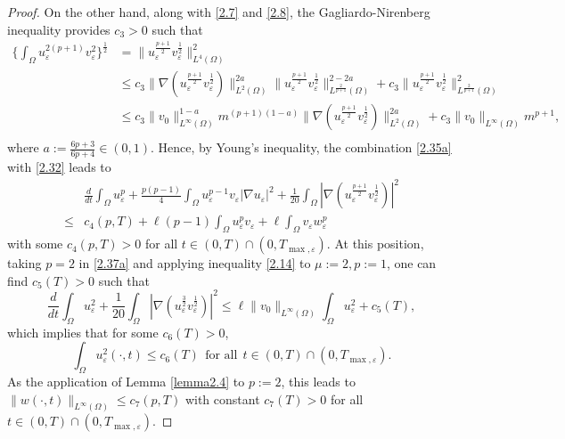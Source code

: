 \documentclass[12pt]{article}
\theoremstyle{plain}
\theoremstyle{definition}
\numberwithin{equation}{section}
\begin{document}
\begin{proof}
     On the other hand, along with \eqref{2.7} and \eqref{2.8}, the Gagliardo-Nirenberg inequality provides $c_3>0$ such that
        \begin{equation}\label{2.32}
    \begin{split}
        \bigg\{\int_\Omega u_\varepsilon^{2(p+1)}v_\varepsilon^2\bigg\}^{\frac1 2}&=\|u_\varepsilon^{\frac{p+1}{2}}v_\varepsilon^{\frac{1}{2}}\|_{L^4(\Omega)}^2\\
        &\leq c_3\|\nabla(u_\varepsilon^{\frac{p+1}{2}}
        v_\varepsilon^{\frac{1}{2}})\|_{L^2(\Omega)}^{2a}
        \|u_\varepsilon^{\frac{p+1}{2}}
        v_\varepsilon^{\frac{1}{2}}\|_{L^{\frac{2}{p+1}}(\Omega)}^{2-2a}
        +c_3\|u_\varepsilon^{\frac{p+1}{2}}v_\varepsilon^{\frac{1}{2}}\|_{L^\frac{2}{p+1}(\Omega)}^2\\
        &\leq c_3\|v_0\|_{L^\infty(\Omega)}^{1-a}m^{(p+1)(1-a)}\|\nabla(u_\varepsilon^{\frac{p+1}{2}}v_\varepsilon^{\frac{1}{2}})\|_{L^2(\Omega)}^{2a}
        +c_3\|v_0\|_{L^\infty(\Omega)}m^{p+1},\\
    \end{split}
    \end{equation}
    where $a:=\frac{6p+3}{6p+4}\in(0,1)$.
    Hence, by Young's inequality, the combination \eqref{2.35a} with \eqref{2.32} leads to
         \begin{align}\label{2.37a}
           &\frac{d}{dt}\int_\Omega u_\varepsilon^p
           + \frac{p(p-1)}{4}\int_\Omega u_\varepsilon^{p-1}v_\varepsilon|\nabla u_\varepsilon|^2
           +\frac1{20}\int_\Omega|\nabla(u_\varepsilon^{\frac{p+1}{2}}v_\varepsilon^{\frac{1}{2}})|^2           \\
           \leq & c_4(p,T)+\ell(p-1)\int_\Omega u_\varepsilon^pv_\varepsilon+\ell\int_\Omega v_\varepsilon w_\varepsilon^{p}\nonumber
    \end{align}
     with some $c_4(p,T)>0$   for all $ t\in(0,T)\cap(0,T_{\max,\varepsilon})
$.
At this position, taking $p=2$ in  \eqref{2.37a} and applying inequality \eqref{2.14} to $\mu:=2, p:=1$, one can find
$c_5(T)>0$ such that
 \begin{equation*}
 \frac{d}{dt}\int_\Omega u_\varepsilon^2+\frac1 {20}\int_\Omega|\nabla(u_\varepsilon^{\frac{3}{2}}v_\varepsilon^{\frac{1}{2}})|^2\leq \ell\|v_0\|_{L^\infty(\Omega)}\int_\Omega u_\varepsilon^2+c_5(T),
 \end{equation*}
  which implies that for some $c_6(T)>0$,
  \begin{equation*}
  \int_\Omega u_\varepsilon^2(\cdot,t)\leq c_6(T)~~\mbox{for all}~~t\in(0,T)\cap(0,T_{\max,\varepsilon}).
  \end{equation*}
  As the application of Lemma \ref{lemma2.4} to $p:=2$, this  leads to
  $\|w(\cdot,t)\|_{L^\infty(\Omega)}\leq c_7(p,T)$ with  constant  $c_7(T)>0$ for all $t\in(0,T)\cap(0,T_{\max,\varepsilon})$.


\end{proof}
\end{document}
